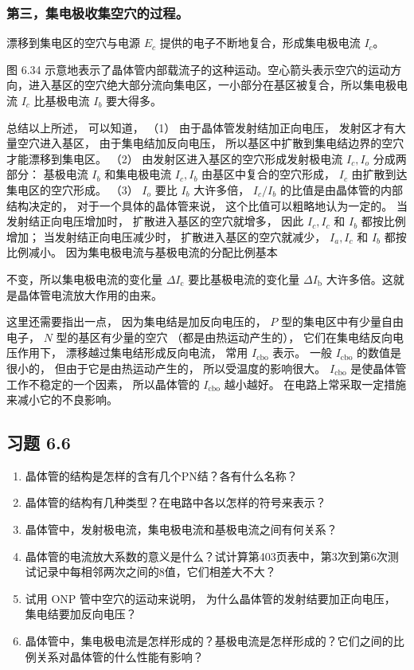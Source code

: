 \subsubsection{第三，集电极收集空穴的过程。}\label{ux7b2cux4e09ux96c6ux7535ux6781ux6536ux96c6ux7a7aux7a74ux7684ux8fc7ux7a0b}

漂移到集电区的空穴与电源 \(E_{c}\) 提供的电子不断地复合，形成集电极电流
\(I_{c}\)。

图 6.34
示意地表示了晶体管内部载流子的这种运动。空心箭头表示空穴的运动方向，进入基区的空穴绝大部分流向集电区，一小部分在基区被复合，所以集电极电流
\(I_{c}\) 比基极电流 \(I_{b}\) 要大得多。

总结以上所述， 可以知道， （1） 由于晶体管发射结加正向电压，
发射区才有大量空穴进入基区， 由于集电结加反向电压，
所以基区中扩散到集电结边界的空穴才能漂移到集电区。 （2）
由发射区进入基区的空穴形成发射极电流 \(I_{c}, I_{o}\) 分成两部分：
基极电流 \(I_{b}\) 和集电极电流 \(I_{c}, I_{b}\)
由基区中复合的空穴形成， \(I_{c}\) 由扩散到达集电区的空穴形成。 （3）
\(I_{o}\) 要比 \(I_{b}\) 大许多倍， \(I_{c} / I_{b}\)
的比值是由晶体管的内部结构决定的， 对于一个具体的晶体管来说，
这个比值可以粗略地认为一定的。 当发射结正向电压增加时，
扩散进入基区的空穴就增多， 因此 \(I_{c}, I_{c}\) 和 \(I_{b}\)
都按比例增加； 当发射结正向电压减少时， 扩散进入基区的空穴就减少，
\(I_{a}, I_{c}\) 和 \(I_{b}\) 都按比例减小。
因为集电极电流与基极电流的分配比例基本

不变，所以集电极电流的变化量 \(\Delta I_{\mathrm{c}}\)
要比基极电流的变化量 \(\Delta I_{\mathrm{b}}\)
大许多倍。这就是晶体管电流放大作用的由来。

这里还需要指出一点， 因为集电结是加反向电压的， \(P\)
型的集电区中有少量自由电子， \(N\) 型的基区有少量的空穴
（都是由热运动产生的）， 它们在集电结反向电压作用下，
漂移越过集电结形成反向电流， 常用 \(I_{\mathrm{cbo}}\) 表示。 一般
\(I_{\mathrm{cbo}}\) 的数值是很小的， 但由于它是由热运动产生的，
所以受温度的影响很大。 \(I_{\mathrm{cbo}}\)
是使晶体管工作不稳定的一个因素， 所以晶体管的 \(I_{\mathrm{cbo}}\)
越小越好。 在电路上常采取一定措施来减小它的不良影响。

\subsection{习题 6.6}\label{ux4e60ux9898-6.6}

\begin{enumerate}
\def\labelenumi{\arabic{enumi}.}
\item
  晶体管的结构是怎样的含有几个PN结？各有什么名称？
\item
  晶体管的结构有几种类型？在电路中各以怎样的符号来表示？
\item
  晶体管中，发射极电流，集电极电流和基极电流之间有何关系？
\item
  晶体管的电流放大系数的意义是什么？试计算第403页表中，第3次到第6次测试记录中每相邻两次之间的8值，它们相差大不大？
\item
  试用 ONP 管中空穴的运动来说明， 为什么晶体管的发射结要加正向电压，
  集电结要加反向电压？
\item
  晶体管中，集电极电流是怎样形成的？基极电流是怎样形成的？它们之间的比例关系对晶体管的什么性能有影响？
\end{enumerate}

